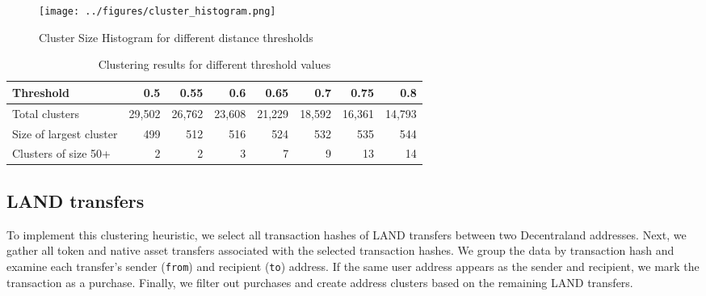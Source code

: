 \documentclass[12pt,a4paper,titlepage,oneside,english]{article}
\begin{document}
\begin{figure}[h]
	\centering
	\texttt{[image: ../figures/cluster\_histogram.png]}
	\caption{Cluster Size Histogram for different distance thresholds}
	\label{fig:threshold_sensitivity}
\end{figure}


\begin{table}[h!]
\small
  \centering
  \begin{tabular}{lrrrrrrr}
    \hline
	\textbf{Threshold} & \textbf{0.5} & \textbf{0.55} &\textbf{0.6} & \textbf{0.65} & \textbf{0.7} & \textbf{0.75} & \textbf{0.8} \\
	\hline
Total clusters 			& 29,502 & 26,762 & 23,608 & 21,229 & 18,592 & 16,361 & 14,793 \\
Size of largest cluster & 499 & 	512 & 516 & 	524 & 532 & 535 & 544\\
Clusters of size 50+ 	& 2 & 2 & 3 & 7 & 9  & 13 & 14\\
    \hline
  \end{tabular}
  \caption{Clustering results for different threshold values}
  \label{tbl:cluster_table}
\end{table}




\subsection{LAND transfers}

To implement this clustering heuristic, we select all transaction hashes of LAND transfers between two Decentraland addresses. Next, we gather all token and native asset transfers associated with the selected transaction hashes. We group the data by transaction hash and examine each transfer's sender (\texttt{from}) and recipient (\texttt{to}) address. If the same user address appears as the sender and recipient, we mark the transaction as a purchase. Finally, we filter out purchases and create address clusters based on the remaining LAND transfers.
\end{document}
